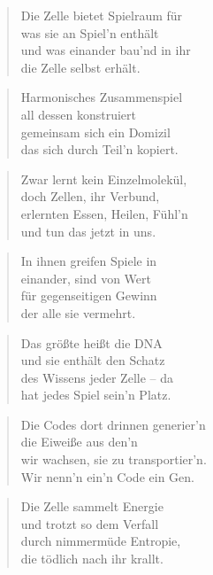 \documentclass[10pt,a4paper]{article}
\begin{document}
\begin{paracol}{2}
\begin{verse}
Die Zelle bietet Spielraum für \\
was sie an Spiel’n enthält \\
und was einander bau’nd in ihr \\
die Zelle selbst erhält. \\
\end{verse}

\begin{verse}
Harmonisches Zusammenspiel \\
all dessen konstruiert \\
gemeinsam sich ein Domizil \\
das sich durch Teil’n kopiert. \\
\end{verse}

\begin{verse}
Zwar lernt kein Einzelmolekül, \\
doch Zellen, ihr Verbund, \\
erlernten Essen, Heilen, Fühl’n \\
und tun das jetzt in uns. \\
\end{verse}

\begin{verse}
In ihnen greifen Spiele in \\
einander, sind von Wert \\
für gegenseitigen Gewinn \\
der alle sie vermehrt. \\
\end{verse}

\begin{verse}
Das größte heißt die DNA \\
und sie enthält den Schatz \\
des Wissens jeder Zelle – da \\
hat jedes Spiel sein’n Platz. \\
\end{verse}

\begin{verse}
Die Codes dort drinnen generier’n \\
die Eiweiße aus den’n \\
wir wachsen, sie zu transportier’n. \\
Wir nenn’n ein’n Code ein Gen. \\
\end{verse}

\begin{verse}
Die Zelle sammelt Energie \\
und trotzt so dem Verfall \\
durch nimmermüde Entropie, \\
die tödlich nach ihr krallt. \\
\end{verse}


\end{paracol}
\end{document}
